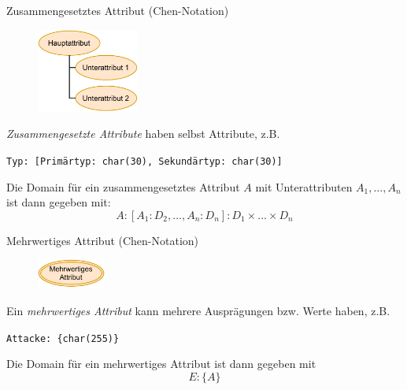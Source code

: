 \begin{defi}{Zusammengesetztes Attribut (Chen-Notation)}
    \begin{figure}
        \begin{center}
            \includegraphics[width=0.3\textwidth]{includes/figures/definition_entity_relationship_model_attribute_combined_alt.pdf}
        \end{center}
    \end{figure}
    \emph{Zusammengesetzte Attribute} haben selbst Attribute, z.B.
    \begin{center}
        \texttt{Typ: [Primärtyp: char(30), Sekundärtyp: char(30)]}
    \end{center}

    Die Domain für ein zusammengesetztes Attribut $A$ mit Unterattributen $A_1, \ldots, A_n$ ist dann gegeben mit:
    \[
        A: [A_1 : D_2, \ldots, A_n:D_n]: D_1 \times \ldots \times D_n
    \]

    \vspace{3em}
\end{defi}

\begin{defi}{Mehrwertiges Attribut (Chen-Notation)}
    \begin{figure}
        \begin{center}
            \includegraphics[width=0.2\textwidth]{includes/figures/definition_entity_relationship_model_attribute_multivalue.pdf}
        \end{center}
    \end{figure}
    Ein \emph{mehrwertiges Attribut} kann mehrere Ausprägungen bzw. Werte haben, z.B.
    \begin{center}
        \texttt{Attacke: \{char(255)\}}
    \end{center}

    Die Domain für ein mehrwertiges Attribut ist dann gegeben mit
    \[
        E : \{A\}
    \]
\end{defi}

